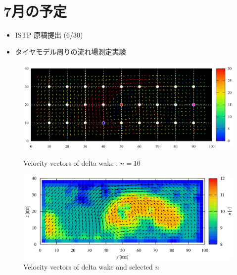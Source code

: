 \documentclass[twocolumn,a4j]{jsarticle}
\begin{document}
\section{7月の予定}
\begin{itemize}
  \item ISTP 原稿提出 (6/30)
  \item タイヤモデル周りの流れ場測定実験
\end{itemize}

\begin{figure}[htbp]
  \footnotesize
  \begin{center}
    \includegraphics[width=140mm]{../images/vector_grid.png}
    \caption{Velocity vectors of delta wake : $n = 10$}
    \includegraphics[width=150mm]{../images/velocity_and_vorticity.png}
    \caption{Velocity vectors of delta wake and selected $n$ }
  \end{center}
\end{figure}
\end{document}
